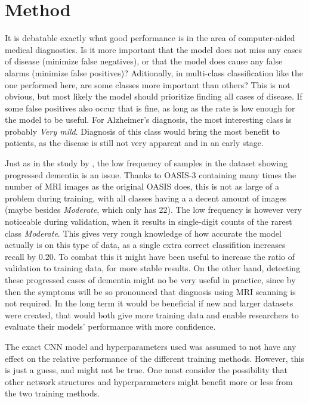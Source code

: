 \documentclass{kththesis}
\begin{document}
\section{Method}
It is debatable exactly what good performance is in the area of computer-aided medical diagnostics. Is it more important that the model does not miss any cases of disease (minimize false negatives), or that the model does cause any false alarms (minimize false positives)? Aditionally, in multi-class classification like the one performed here, are some classes more important than others? This is not obvious, but most likely the model should prioritize finding all cases of disease. If some false positives also occur that is fine, as long as the rate is low enough for the model to be useful. For Alzheimer's diagnosis, the most interesting class is probably \textit{Very mild}. Diagnosis of this class would bring the most benefit to patients, as the disease is still not very apparent and in an early stage.

Just as in the study by \textcite{islam2018early}, the low frequency of samples in the dataset showing progressed dementia is an issue. Thanks to OASIS-3 containing many times the number of MRI images as the original OASIS does, this is not as large of a problem during training, with all classes having a a decent amount of images (maybe besides \textit{Moderate}, which only has 22). The low frequency is however very noticeable during validation, when it results in single-digit counts of the rarest class \textit{Moderate}. This gives very rough knowledge of how accurate the model actually is on this type of data, as a single extra correct classifition increases recall by $0.20$. To combat this it might have been useful to increase the ratio of validation to training data, for more stable results. On the other hand, detecting these progressed cases of dementia might no be very useful in practice, since by then the symptoms will be so pronounced that diagnosis using MRI scanning is not required. In the long term it would be beneficial if new and larger datasets were created, that would both give more training data and enable researchers to evaluate their models' performance with more confidence.

The exact CNN model and hyperparameters used was assumed to not have any effect on the relative performance of the different training methods. However, this is just a guess, and might not be true. One must consider the possibility that other network structures and hyperparameters might benefit more or less from the two training methods.
\end{document}
